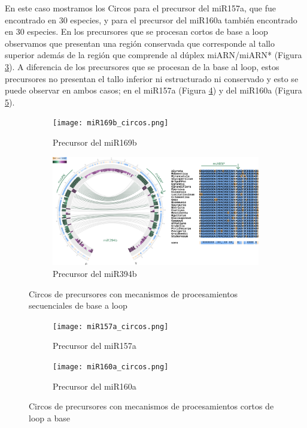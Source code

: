 En este caso mostramos los Circos para el precursor del miR157a, que fue encontrado en 30 especies, y para el precursor del miR160a también encontrado en 30 especies. 
En los precursores que se procesan cortos de base a loop observamos que presentan una región conservada que corresponde al tallo superior además de la región que comprende al dúplex miARN/miARN* (Figura \ref{fig:seqBTL_circos}).
A diferencia de los precursores que se procesan de la base al loop, estos precursores no presentan el tallo inferior ni estructurado ni conservado y esto se puede observar en ambos casos; en el miR157a (Figura \ref{subfig:miR157a_circos}) y del miR160a (Figura \ref{subfig:miR160a_circos}).


\begin{landscape}
	\begin{figure}
	\centering
	\begin{subfigure}{.75\textwidth}
 \centering
 \texttt{[image: miR169b\_circos.png]}
 \caption{Precursor del miR169b}
 \label{subfig:miR169b_circos}
	\end{subfigure}%
	\begin{subfigure}{.75\textwidth}
 \centering
 \includegraphics[width=.9\linewidth]{miR394b_circos.png}
 \caption{Precursor del miR394b}
 \label{subfig:miR394b_circos}
	\end{subfigure}
	\caption{Circos de precursores con mecanismos de procesamientos secuenciales de base a loop}
	\label{fig:seqBTL_circos}
	\end{figure}
\end{landscape}




\begin{landscape}
	\begin{figure}
	\centering
	\begin{subfigure}{.75\textwidth}
 \centering
 \texttt{[image: miR157a\_circos.png]}
 \caption{Precursor del miR157a}
 \label{subfig:miR157a_circos}
	\end{subfigure}%
	\begin{subfigure}{.75\textwidth}
 \centering
 \texttt{[image: miR160a\_circos.png]}
 \caption{Precursor del miR160a}
 \label{subfig:miR160a_circos}
	\end{subfigure}
	\caption{Circos de precursores con mecanismos de procesamientos cortos de loop a base}
	\label{fig:srLTB_circos}
	\end{figure}
\end{landscape}

